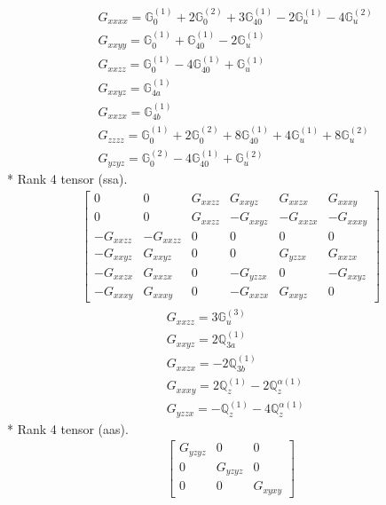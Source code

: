 \documentclass[fleqn,8pt,landscape]{jsarticle}
\begin{document}
\begin{align*}
& G_{xxxx} = \mathbb{G}_{0}^{(1)} + 2 \mathbb{G}_{0}^{(2)} + 3 \mathbb{G}_{40}^{(1)} - 2 \mathbb{G}_{u}^{(1)} - 4 \mathbb{G}_{u}^{(2)} \\
& G_{xxyy} = \mathbb{G}_{0}^{(1)} + \mathbb{G}_{40}^{(1)} - 2 \mathbb{G}_{u}^{(1)} \\
& G_{xxzz} = \mathbb{G}_{0}^{(1)} - 4 \mathbb{G}_{40}^{(1)} + \mathbb{G}_{u}^{(1)} \\
& G_{xxyz} = \mathbb{G}_{4a}^{(1)} \\
& G_{xxzx} = \mathbb{G}_{4b}^{(1)} \\
& G_{zzzz} = \mathbb{G}_{0}^{(1)} + 2 \mathbb{G}_{0}^{(2)} + 8 \mathbb{G}_{40}^{(1)} + 4 \mathbb{G}_{u}^{(1)} + 8 \mathbb{G}_{u}^{(2)} \\
& G_{yzyz} = \mathbb{G}_{0}^{(2)} - 4 \mathbb{G}_{40}^{(1)} + \mathbb{G}_{u}^{(2)}
\end{align*}
* Rank 4 tensor (ssa).
\begin{align*}
\begin{bmatrix} 0 & 0 & G_{xxzz} & G_{xxyz} & G_{xxzx} & G_{xxxy} \\ 0 & 0 & G_{xxzz} & - G_{xxyz} & - G_{xxzx} & - G_{xxxy} \\ - G_{xxzz} & - G_{xxzz} & 0 & 0 & 0 & 0 \\ - G_{xxyz} & G_{xxyz} & 0 & 0 & G_{yzzx} & G_{xxzx} \\ - G_{xxzx} & G_{xxzx} & 0 & - G_{yzzx} & 0 & - G_{xxyz} \\ - G_{xxxy} & G_{xxxy} & 0 & - G_{xxzx} & G_{xxyz} & 0 \end{bmatrix}
\end{align*}
\begin{align*}
& G_{xxzz} = 3 \mathbb{G}_{u}^{(3)} \\
& G_{xxyz} = 2 \mathbb{Q}_{3a}^{(1)} \\
& G_{xxzx} = - 2 \mathbb{Q}_{3b}^{(1)} \\
& G_{xxxy} = 2 \mathbb{Q}_{z}^{(1)} - 2 \mathbb{Q}_{z}^{\alpha(1)} \\
& G_{yzzx} = - \mathbb{Q}_{z}^{(1)} - 4 \mathbb{Q}_{z}^{\alpha(1)}
\end{align*}
* Rank 4 tensor (aas).
\begin{align*}
\begin{bmatrix} G_{yzyz} & 0 & 0 \\ 0 & G_{yzyz} & 0 \\ 0 & 0 & G_{xyxy} \end{bmatrix}
\end{align*}
\end{document}
